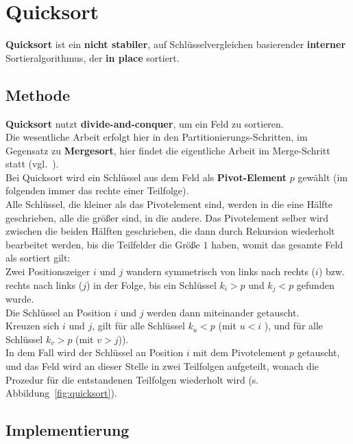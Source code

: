 \section{Quicksort}

\textbf{Quicksort} ist ein \textbf{nicht stabiler}, auf Schlüsselvergleichen basierender \textbf{interner} Sortieralgorithmus, der \textbf{in place} sortiert.

\subsection{Methode}

\textbf{Quicksort} nutzt \textbf{divide-and-conquer}, um ein Feld zu sortieren.\\
Die wesentliche Arbeit erfolgt hier in den Partitionierungs-Schritten, im Gegensatz zu \textbf{Mergesort}, hier findet die eigentliche Arbeit im Merge-Schritt statt (vgl.~\cite[174]{GD18e}).\\

\noindent
Bei Quicksort  wird ein Schlüssel aus dem Feld als \textbf{Pivot-Element} $p$ gewählt (im folgenden immer das rechte einer Teilfolge).\\
Alle Schlüssel, die kleiner als das Pivotelement sind, werden in die eine Hälfte geschrieben, alle die größer sind, in die andere.
Das Pivotelement selber wird zwischen die beiden Hälften geschrieben, die dann durch Rekursion wiederholt bearbeitet werden, bis die Teilfelder die Größe $1$ haben, womit das gesamte Feld als sortiert gilt:\\
Zwei Positionszeiger $i$ und $j$ wandern symmetrisch von links nach rechts ($i$) bzw. rechts nach links ($j$) in der Folge, bis ein Schlüssel $k_i > p$ und $k_j < p$ gefunden wurde. \\
Die Schlüssel an Position $i$ und $j$ werden dann miteinander getauscht.\\
Kreuzen sich $i$ und $j$, gilt für alle Schlüssel $k_u < p$ (mit $u < i$ ), und für alle Schlüssel $k_v > p$ (mit $v > j$)).\\
In dem Fall wird der Schlüssel an Position $i$ mit dem Pivotelement $p$ getauscht, und das Feld wird an dieser Stelle in zwei Teilfolgen aufgeteilt, wonach die Prozedur für die entstandenen Teilfolgen wiederholt wird (s. Abbildung~\ref{fig:quicksort}).

\subsection{Implementierung}

